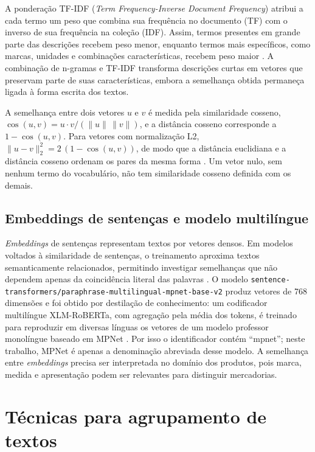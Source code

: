 \documentclass[english,brazilian]{UNISINOSmonografia}
\begin{document}
A ponderação TF-IDF (\textit{Term Frequency-Inverse Document Frequency}) atribui a cada termo um peso que combina sua frequência no documento (TF) com o inverso de sua frequência na coleção (IDF). Assim, termos presentes em grande parte das descrições recebem peso menor, enquanto termos mais específicos, como marcas, unidades e combinações características, recebem peso maior \cite{salton1988term,manning2008informationretrieval}. A combinação de n-gramas e TF-IDF transforma descrições curtas em vetores que preservam parte de suas características, embora a semelhança obtida permaneça ligada à forma escrita dos textos.

A semelhança entre dois vetores $u$ e $v$ é medida pela similaridade cosseno, $\cos(u,v)=u\cdot v/(\lVert u\rVert\,\lVert v\rVert)$, e a distância cosseno corresponde a $1-\cos(u,v)$. Para vetores com normalização L2, $\lVert u-v\rVert_2^2=2\,(1-\cos(u,v))$, de modo que a distância euclidiana e a distância cosseno ordenam os pares da mesma forma \cite{manning2008informationretrieval}. Um vetor nulo, sem nenhum termo do vocabulário, não tem similaridade cosseno definida com os demais.

\subsection{Embeddings de sentenças e modelo multilíngue}

\textit{Embeddings} de sentenças representam textos por vetores densos. Em modelos voltados à similaridade de sentenças, o treinamento aproxima textos semanticamente relacionados, permitindo investigar semelhanças que não dependem apenas da coincidência literal das palavras \cite{reimers2019sentencebert}. O modelo \nolinkurl{sentence-transformers/paraphrase-multilingual-mpnet-base-v2} produz vetores de 768 dimensões e foi obtido por destilação de conhecimento: um codificador multilíngue XLM-RoBERTa, com agregação pela média dos tokens, é treinado para reproduzir em diversas línguas os vetores de um modelo professor monolíngue baseado em MPNet \cite{reimers2020multilingual,conneau2020xlmr,song2020mpnet,sentencetransformers-mpnet}. Por isso o identificador contém ``mpnet''; neste trabalho, MPNet é apenas a denominação abreviada desse modelo. A semelhança entre \textit{embeddings} precisa ser interpretada no domínio dos produtos, pois marca, medida e apresentação podem ser relevantes para distinguir mercadorias.

\section{Técnicas para agrupamento de textos}
\label{sec:agrupamento}
\end{document}
